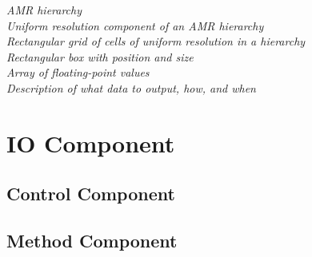 \begin{tabbing}
 \>\>\>         \>\> \textit{AMR hierarchy} \\
 \>\>\>             \>\> \textit{Uniform resolution component of an AMR hierarchy} \\
 \>\>\>             \>\> \textit{Rectangular grid of cells of uniform resolution in a hierarchy} \\
 \>\>\>\>               \> \textit{Rectangular box with position and size} \\
 \>\>\>\>             \> \textit{Array of floating-point values} \\
 \>\>            \>\>\> \textit{Description of what data to output, how, and when}
\end{tabbing}






















\chapter{IO Component} \label{c:IO}

\section{Control Component}

\section{Method Component}

